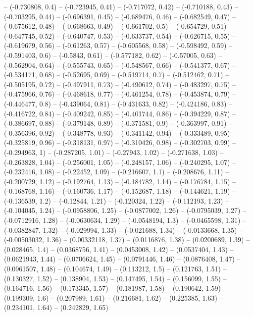 -- (-0.730808, 0.4)
-- (-0.723945, 0.41)
-- (-0.717072, 0.42)
-- (-0.710188, 0.43)
-- (-0.703295, 0.44)
-- (-0.696391, 0.45)
-- (-0.689476, 0.46)
-- (-0.682549, 0.47)
-- (-0.675612, 0.48)
-- (-0.668663, 0.49)
-- (-0.661702, 0.5)
-- (-0.654729, 0.51)
-- (-0.647745, 0.52)
-- (-0.640747, 0.53)
-- (-0.633737, 0.54)
-- (-0.626715, 0.55)
-- (-0.619679, 0.56)
-- (-0.61263, 0.57)
-- (-0.605568, 0.58)
-- (-0.598492, 0.59)
-- (-0.591403, 0.6)
-- (-0.5843, 0.61)
-- (-0.577182, 0.62)
-- (-0.57005, 0.63)
-- (-0.562904, 0.64)
-- (-0.555743, 0.65)
-- (-0.548567, 0.66)
-- (-0.541377, 0.67)
-- (-0.534171, 0.68)
-- (-0.52695, 0.69)
-- (-0.519714, 0.7)
-- (-0.512462, 0.71)
-- (-0.505195, 0.72)
-- (-0.497911, 0.73)
-- (-0.490612, 0.74)
-- (-0.483297, 0.75)
-- (-0.475966, 0.76)
-- (-0.468618, 0.77)
-- (-0.461254, 0.78)
-- (-0.453874, 0.79)
-- (-0.446477, 0.8)
-- (-0.439064, 0.81)
-- (-0.431633, 0.82)
-- (-0.424186, 0.83)
-- (-0.416722, 0.84)
-- (-0.409242, 0.85)
-- (-0.401744, 0.86)
-- (-0.394229, 0.87)
-- (-0.386697, 0.88)
-- (-0.379148, 0.89)
-- (-0.371581, 0.9)
-- (-0.363997, 0.91)
-- (-0.356396, 0.92)
-- (-0.348778, 0.93)
-- (-0.341142, 0.94)
-- (-0.333489, 0.95)
-- (-0.325819, 0.96)
-- (-0.318131, 0.97)
-- (-0.310426, 0.98)
-- (-0.302703, 0.99)
-- (-0.294963, 1)
-- (-0.287205, 1.01)
-- (-0.27943, 1.02)
-- (-0.271638, 1.03)
-- (-0.263828, 1.04)
-- (-0.256001, 1.05)
-- (-0.248157, 1.06)
-- (-0.240295, 1.07)
-- (-0.232416, 1.08)
-- (-0.22452, 1.09)
-- (-0.216607, 1.1)
-- (-0.208676, 1.11)
-- (-0.200729, 1.12)
-- (-0.192764, 1.13)
-- (-0.184782, 1.14)
-- (-0.176784, 1.15)
-- (-0.168768, 1.16)
-- (-0.160736, 1.17)
-- (-0.152687, 1.18)
-- (-0.144621, 1.19)
-- (-0.136539, 1.2)
-- (-0.12844, 1.21)
-- (-0.120324, 1.22)
-- (-0.112193, 1.23)
-- (-0.104045, 1.24)
-- (-0.0958806, 1.25)
-- (-0.0877002, 1.26)
-- (-0.0795039, 1.27)
-- (-0.0712916, 1.28)
-- (-0.0630634, 1.29)
-- (-0.0548194, 1.3)
-- (-0.0465598, 1.31)
-- (-0.0382847, 1.32)
-- (-0.029994, 1.33)
-- (-0.021688, 1.34)
-- (-0.0133668, 1.35)
-- (-0.00503032, 1.36)
-- (0.00332118, 1.37)
-- (0.0116876, 1.38)
-- (0.0200689, 1.39)
-- (0.028465, 1.4)
-- (0.0368756, 1.41)
-- (0.0453008, 1.42)
-- (0.0537404, 1.43)
-- (0.0621943, 1.44)
-- (0.0706624, 1.45)
-- (0.0791446, 1.46)
-- (0.0876408, 1.47)
-- (0.0961507, 1.48)
-- (0.104674, 1.49)
-- (0.113212, 1.5)
-- (0.121763, 1.51)
-- (0.130327, 1.52)
-- (0.138904, 1.53)
-- (0.147495, 1.54)
-- (0.156099, 1.55)
-- (0.164716, 1.56)
-- (0.173345, 1.57)
-- (0.181987, 1.58)
-- (0.190642, 1.59)
-- (0.199309, 1.6)
-- (0.207989, 1.61)
-- (0.216681, 1.62)
-- (0.225385, 1.63)
-- (0.234101, 1.64)
-- (0.242829, 1.65)
